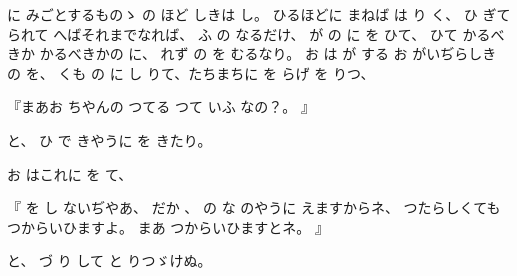 に
みごとするものゝ
の
ほど
しきは
し。
ひるほどに
まねば
は
り
く、
ひ
ぎて
られて
へばそれまでなれば、
ふ
の
なるだけ、
が
の
に
を
ひて、
ひて
かるべきか
かるべきかの
に、
れず
の
を
むるなり。
お
は
が
する
お
がいぢらしき
の
を、
くも
の
に
し
りて、たちまちに
を
らげ
を
りつ、

『まあお
ちやんの
つてる
つて
いふ
なの？。
』

と、
ひ
で
きやうに
を
きたり。

お
はこれに
を
て、

『
を
し
ないぢやあ、
だか
、
の
な
のやうに
えますからネ、
つたらしくても
つからいひますよ。
まあ
つからいひますとネ。
』

と、
づ
り
して
と
りつゞけぬ。

